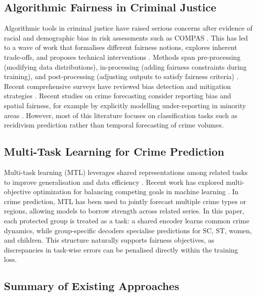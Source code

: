 \documentclass{svproc}
\begin{document}
\subsection{Algorithmic Fairness in Criminal Justice}

Algorithmic tools in criminal justice have raised serious concerns after evidence of racial and demographic bias in risk assessments such as COMPAS \cite{angwin2016machine}. This has led to a wave of work that formalises different fairness notions, explores inherent trade-offs, and proposes technical interventions \cite{dressel2018accuracy,verma2018fairness,kleinberg2016inherent}. Methods span pre-processing (modifying data distributions), in-processing (adding fairness constraints during training), and post-processing (adjusting outputs to satisfy fairness criteria) \cite{kamiran2012data,zafar2017fairness,hardt2016equality}. Recent comprehensive surveys have reviewed bias detection and mitigation strategies \cite{wang2023fairness,mishra2023fairness}. Recent studies on crime forecasting consider reporting bias and spatial fairness, for example by explicitly modelling under-reporting in minority areas \cite{wu2024improving}. However, most of this literature focuses on classification tasks such as recidivism prediction rather than temporal forecasting of crime volumes.

\subsection{Multi-Task Learning for Crime Prediction}

Multi-task learning (MTL) leverages shared representations among related tasks to improve generalisation and data efficiency \cite{caruana1997multitask,zhang2021survey}. Recent work has explored multi-objective optimization for balancing competing goals in machine learning \cite{chatterjee2023multi}. In crime prediction, MTL has been used to jointly forecast multiple crime types or regions, allowing models to borrow strength across related series. In this paper, each protected group is treated as a task: a shared encoder learns common crime dynamics, while group-specific decoders specialise predictions for SC, ST, women, and children. This structure naturally supports fairness objectives, as discrepancies in task-wise errors can be penalised directly within the training loss.

\subsection{Summary of Existing Approaches}
\end{document}
